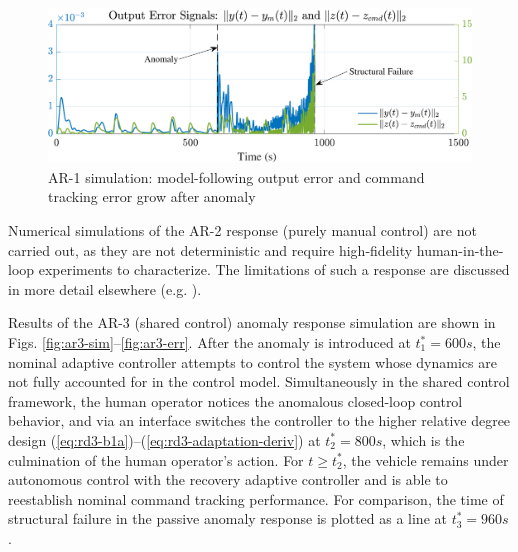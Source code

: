 \documentclass[english]{ifacconf}
\begin{document}
\begin{figure}[htbp]
	\centering
	\includegraphics[width=\columnwidth]{../fig/ar1-err.pdf}
	\caption{AR-1 simulation: model-following output error and command tracking error grow after anomaly}
	\label{fig:ar1-err}
\end{figure}

Numerical simulations of the AR-2 response (purely manual control) are not carried out, as they are not deterministic and require high-fidelity human-in-the-loop experiments to characterize. The limitations of such a response are discussed in more detail elsewhere (e.g. \cite{endsley1996automation, hess2015modeling}).

Results of the AR-3 (shared control) anomaly response simulation are shown in Figs. \ref{fig:ar3-sim}--\ref{fig:ar3-err}. After the anomaly is introduced at $t_1^* = 600 s$, the nominal adaptive controller attempts to control the system whose dynamics are not fully accounted for in the control model. Simultaneously in the shared control framework, the human operator notices the anomalous closed-loop control behavior, and via an interface switches the controller to the higher relative degree design (\ref{eq:rd3-b1a})--(\ref{eq:rd3-adaptation-deriv}) at $t_2^* = 800 s$, which is the culmination of the human operator's action. For $t \geq t_2^*$, the vehicle remains under autonomous control with the recovery adaptive controller and is able to reestablish nominal command tracking performance. For comparison, the time of structural failure in the passive anomaly response is plotted as a line at $t_3^* = 960 s$.
\end{document}
